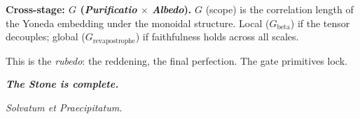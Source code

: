 \documentclass[twocolumn]{article}
\begin{document}
\smallskip
\noindent\textbf{Cross-stage: $G$ (\emph{Purificatio} $\times$ \emph{Albedo}).}\quad
$G$ (scope) is the correlation length of the Yoneda embedding under the monoidal structure.
Local ($G_{\text{beta}}$) if the tensor decouples; global ($G_{\text{revapostrophe}}$) if faithfulness holds across all scales.

\smallskip
This is the \emph{rubedo}: the reddening, the final perfection.
The gate primitives lock.

\textbf{\textit{The Stone is complete.}}

\textit{Solvatum et Praecipitatum.}
\end{document}
